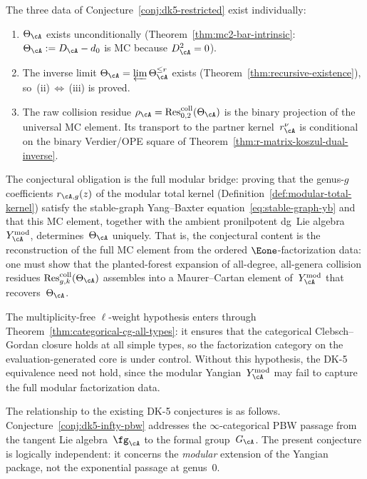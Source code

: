 \begin{remark}
\label{rem:dk5-restricted-status}
The three data of Conjecture~\ref{conj:dk5-restricted} exist
individually:
\begin{enumerate}[label=\textup{(\alph*)}]
\item $\Theta_\cA$ exists unconditionally
 \textup{(}Theorem~\ref{thm:mc2-bar-intrinsic}:
 $\Theta_\cA := D_\cA - d_0$ is MC because
 $D_\cA^2 = 0$\textup{)}.
\item The inverse limit
 $\Theta_\cA = \varprojlim \Theta_\cA^{\leq r}$ exists
 \textup{(}Theorem~\ref{thm:recursive-existence}\textup{)},
 so~\textup{(ii)}\,$\Leftrightarrow$\,\textup{(iii)} is proved.
\item The raw collision residue
 $\rho_\cA=\operatorname{Res}^{\mathrm{coll}}_{0,2}(\Theta_\cA)$
 is the binary projection of the universal MC element.  Its transport
 to the partner kernel~$r_\cA^\nu$ is conditional on the binary
 Verdier/OPE square of
 Theorem~\ref{thm:r-matrix-koszul-dual-inverse}.
\end{enumerate}
The conjectural obligation is the full modular bridge: proving that
the genus-$g$ coefficients $r_{\cA,g}(z)$ of the modular total
kernel
\textup{(}Definition~\ref{def:modular-total-kernel}\textup{)}
satisfy the stable-graph Yang--Baxter
equation~\eqref{eq:stable-graph-yb} and that this MC element,
together with the ambient pronilpotent dg~Lie
algebra~$\Ymod_\cA$, determines~$\Theta_\cA$
uniquely. That is, the conjectural content is
the reconstruction of the full MC element from the ordered
$\Eone$-factorization data: one must show that
the planted-forest expansion of all-degree, all-genera
collision residues
$\operatorname{Res}^{\mathrm{coll}}_{g,k}(\Theta_\cA)$
assembles into a Maurer--Cartan element of~$\Ymod_\cA$
that recovers~$\Theta_\cA$.

The multiplicity-free $\ell$-weight hypothesis enters through
Theorem~\ref{thm:categorical-cg-all-types}: it ensures
that the categorical Clebsch--Gordan closure holds at all
simple types, so the factorization category on the
evaluation-generated core is under control. Without this
hypothesis, the DK-5 equivalence need not hold,
since the modular Yangian~$\Ymod_\cA$ may fail to capture
the full modular factorization data.

The relationship to the existing DK-5 conjectures is as
follows. Conjecture~\ref{conj:dk5-infty-pbw} addresses the
$\infty$-categorical PBW passage from the tangent Lie
algebra~$\fg_\cA$ to the formal group~$G_\cA$. The present
conjecture is logically independent: it concerns the
\emph{modular} extension of the Yangian package, not the
exponential passage at genus~$0$.
\end{remark}

